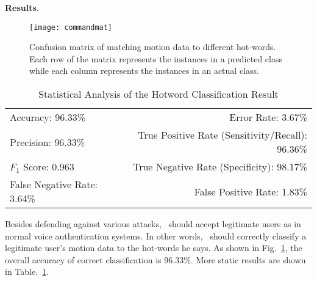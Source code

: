 \textbf{Results}.
\begin{figure}[h]
	\centering
	\texttt{[image: commandmat]}
	\caption[Confusion Matrix of Matching Motion Data to Different Hot-Words. ]{Confusion matrix of matching motion data to different hot-words. Each row of the matrix represents the instances in a predicted class while each column represents the instances in an actual class.}
	\label{fig:commadmat}
\end{figure}
\begin{table}[t]
	\caption{Statistical Analysis of the Hotword Classification Result}
	\label{tab:commandTable}
	\centering
	\begin{tabular}{lr}
		\toprule
		Accuracy: 96.33\% & \hspace{-.55in} Error Rate: 3.67\% \\
		Precision: 96.33\% & \hspace{-.55in} True Positive Rate (Sensitivity/Recall): 96.36\% \\
		$F_1$ Score: 0.963 & \hspace{-.55in} True Negative Rate (Specificity): 98.17\% \\
		False Negative Rate: 3.64\%  & \hspace{-.55in} False Positive Rate: 1.83\% \\
		\bottomrule
	\end{tabular}
\end{table}

Besides defending against various attacks, \shortname~should accept legitimate users as in normal voice authentication systems. In other words, \shortname~should correctly classify a legitimate user's motion data to the hot-words he says. As shown in Fig.~\ref{fig:commadmat}, the overall accuracy of correct classification is 96.33\%.  More static results are shown in Table.~\ref{tab:commandTable}.



